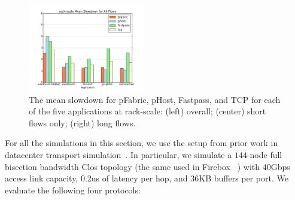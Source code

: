 %
\begin{figure}
  \centering
    \includegraphics[width = 2in]{img/fig12_rack-scale_slowdowns} 
  \caption{\small{The mean slowdown for pFabric, pHost, Fastpass, and TCP for each of the five applications at rack-scale: (left) overall; (center) short flows only; (right) long flows.}}
  \label{fig:phostp-rs}
\end{figure}
%
For all the simulations in this section, we use the setup from prior work in datacenter transport simulation~\cite{pfabric, phost}. In particular, we simulate a $144$-node full bisection bandwidth Clos topology (the same used in Firebox~\cite{firebox} ) with $40$Gbps access link capacity, $0.2$us of latency per hop, and $36$KB buffers per port. We evaluate the following four protocols:


